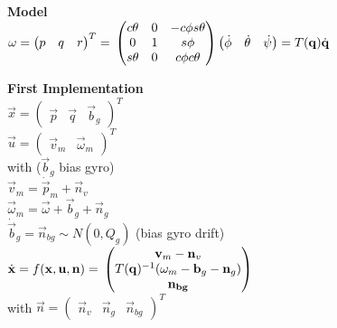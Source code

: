 \textbf{Model}\\
$\vec{\omega} = \begin{pmatrix} p & q & r\end{pmatrix}^T = \\
\begin{pmatrix}
  c \theta & 0 & -c \phi s \theta \\
  0 & 1 & s \phi \\
  s \theta & 0 & c \phi c \theta
\end{pmatrix}
\begin{pmatrix}
  \dot{\phi} & \dot{\theta} & \dot{\psi}
\end{pmatrix} = T(\vec{q}) \dot{\vec{q}}
$

\textbf{First Implementation}\\
$\vec{x} = \begin{pmatrix}\vec{p}   & \vec{q} & \vec{b}_g\end{pmatrix}^T$\\
$\vec{u} = \begin{pmatrix}\vec{v}_m & \vec{\omega}_m\end{pmatrix}^T$\\
with ($\vec{b}_g$ bias gyro)\\
$\vec{v}_m = \dot{\vec{p}}_m + \vec{n}_v$\\
$\vec{\omega}_m = \vec{\omega} + \vec{b}_g + \vec{n}_g$\\
$\dot{\vec{b}}_g = \vec{n}_{bg} \sim N(0, Q_g)$ (bias gyro drift)\\

$\dot{\vec{x}} = f(\vec{x}, \vec{u}, \vec{n}) = \\
 \begin{pmatrix}
   \vec{v}_m - \vec{n}_v\\
   T(\vec{q})^{-1} ( \vec{\omega}_m - \vec{b}_g - \vec{n}_g) \\
   \vec{n_{bg}}
 \end{pmatrix}
$\\
with $\vec{n} = \begin{pmatrix} \vec{n}_v & \vec{n}_g &
\vec{n}_{bg}\end{pmatrix}^T$
\newline
